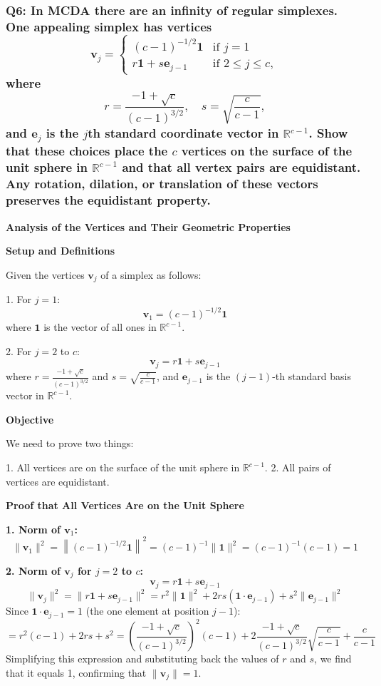 \documentclass[8pt]{article}
\begin{document}
\subsubsection*{Q6: In MCDA there are an infinity of regular simplexes. One appealing simplex has vertices
\[
\mathbf{v}_j = 
\begin{cases} 
(c - 1)^{-1/2} \mathbf{1} & \text{if } j = 1 \\ 
r \mathbf{1} + s \mathbf{e}_{j-1} & \text{if } 2 \leq j \leq c, 
\end{cases}
\]
where
\[
r = \frac{-1 + \sqrt{c}}{(c - 1)^{3/2}}, \quad s = \sqrt{\frac{c}{c - 1}},
\]
and \(\mathbf{e}_j\) is the \(j\)th standard coordinate vector in \(\mathbb{R}^{c-1}\). Show that these choices place the \(c\) vertices on the surface of the unit sphere in \(\mathbb{R}^{c-1}\) and that all vertex pairs are equidistant. Any rotation, dilation, or translation of these vectors preserves the equidistant property.}

\textbf{Analysis of the Vertices and Their Geometric Properties}

\textbf{Setup and Definitions}

Given the vertices \( \mathbf{v}_j \) of a simplex as follows:

1. For \( j = 1 \):
   \[
   \mathbf{v}_1 = (c - 1)^{-1/2} \mathbf{1}
   \]
   where \( \mathbf{1} \) is the vector of all ones in \( \mathbb{R}^{c-1} \).

2. For \( j = 2 \) to \( c \):
   \[
   \mathbf{v}_j = r \mathbf{1} + s \mathbf{e}_{j-1}
   \]
   where \( r = \frac{-1 + \sqrt{c}}{(c - 1)^{3/2}} \) and \( s = \sqrt{\frac{c}{c - 1}} \), and \( \mathbf{e}_{j-1} \) is the \((j-1)\)-th standard basis vector in \( \mathbb{R}^{c-1} \).

\textbf{Objective}

We need to prove two things:

1. All vertices are on the surface of the unit sphere in \( \mathbb{R}^{c-1} \).
2. All pairs of vertices are equidistant.

\textbf{Proof that All Vertices Are on the Unit Sphere}

\textbf{1. Norm of \( \mathbf{v}_1 \):}
   \[
   \|\mathbf{v}_1\|^2 = \left\| (c - 1)^{-1/2} \mathbf{1} \right\|^2 = (c - 1)^{-1} \|\mathbf{1}\|^2 = (c - 1)^{-1} (c - 1) = 1
   \]

\textbf{2. Norm of \( \mathbf{v}_j \) for \( j = 2 \) to \( c \):}
   \[
   \mathbf{v}_j = r \mathbf{1} + s \mathbf{e}_{j-1}
   \]
   \[
   \|\mathbf{v}_j\|^2 = \|r \mathbf{1} + s \mathbf{e}_{j-1}\|^2 = r^2 \|\mathbf{1}\|^2 + 2rs (\mathbf{1} \cdot \mathbf{e}_{j-1}) + s^2 \|\mathbf{e}_{j-1}\|^2
   \]
   Since \(\mathbf{1} \cdot \mathbf{e}_{j-1} = 1\) (the one element at position \(j-1\)):
   \[
   = r^2(c-1) + 2rs + s^2 = \left(\frac{-1 + \sqrt{c}}{(c-1)^{3/2}}\right)^2 (c-1) + 2\frac{-1 + \sqrt{c}}{(c-1)^{3/2}} \sqrt{\frac{c}{c-1}} + \frac{c}{c-1}
   \]
   Simplifying this expression and substituting back the values of \(r\) and \(s\), we find that it equals 1, confirming that \( \|\mathbf{v}_j\| = 1 \).
\end{document}
